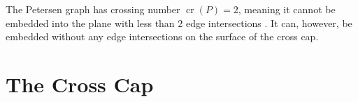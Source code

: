 \documentclass[11pt,            %
               a4paper,         %
               oneside,         %
               DIV12,           %
               fleqn,           %
               halfparskip,     %
               nochapterprefix, %
               bibtotocnumbered,%
              ]{scrartcl} %
\theoremstyle{definition}
\begin{document}
The Petersen graph has crossing number $\operatorname{cr}(P) = 2$,
meaning it cannot be embedded into the plane with less than 2 edge
intersections \cite[p.~2]{crossingnr}. It can, however, be embedded
without any edge intersections on the surface of the cross cap.

\section{The Cross Cap}







\newpage
\nocite{*}


\end{document}
